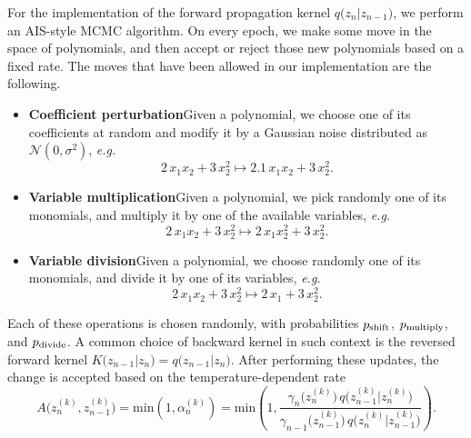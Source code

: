 \documentclass[11pt,a4paper]{article}
\begin{document}
	For the implementation of the forward propagation kernel $q\big(z_{n}\vert z_{n-1}\big)$, we perform an AIS-style MCMC algorithm. On every epoch, we make some move in the space of polynomials, and then accept or reject those new polynomials based on a fixed rate. The moves that have been allowed in our implementation are the following.
	\begin{itemize}
		\item \textbf{Coefficient perturbation}\quad Given a polynomial, we choose one of its coefficients at random and modify it by a Gaussian noise distributed as $\mathcal{N}(0,\sigma^2)$, \textit{e.g.}
		\begin{equation} \label{eq:coeffperturb}
			2\, x_1x_{2} + 3\, x_2^2 \longmapsto  2.1\, x_1x_{2} + 3\, x_2^2.
		\end{equation}
		\item \textbf{Variable multiplication}\quad Given a polynomial, we pick randomly one of its monomials, and multiply it by one of the available variables, \textit{e.g.}
		\begin{equation}
			2\, x_1x_{2} + 3\, x_2^2 \longmapsto  2\, x_1 x_2^{2} + 3\, x_2^2.
		\end{equation}
		\item \textbf{Variable division}\quad Given a polynomial, we choose randomly one of its monomials, and divide it by one of its variables, \textit{e.g.}
		\begin{equation}
			2\,x_1 x_2 + 3\, x_2^2 \longmapsto  2\, x_1 + 3\, x_2^2.
		\end{equation}
	\end{itemize}
	Each of these operations is chosen randomly, with probabilities $p_{\rm shift}$, $p_{\rm multiply}$, and $p_{\rm divide}$.
	A common choice of backward kernel in such context is the reversed forward kernel $K\big(z_{n-1}\vert z_{n}\big) = q\big(z_{n-1}\vert z_{n}\big)$.
	After performing these updates, the change is accepted based on the temperature-dependent rate
	\begin{equation}\label{eq:acceptanceratio}
		A\big(z_{n}^{(k)},z_{n-1}^{(k)}\big) = \mathrm{min} \left(1,\alpha_{n}^{(k)}\right) = \mathrm{min} \left(1,\frac{\gamma_{n}\big(z_{n}^{(k)}\big)\,q\big(z^{(k)}_{n-1}\vert z^{(k)}_{n}\big)}{\gamma_{n-1}\big(z_{n-1}^{(k)}\big)\,q\big(z^{(k)}_{n}\vert z^{(k)}_{n-1}\big)}  \right).
	\end{equation}
\end{document}
